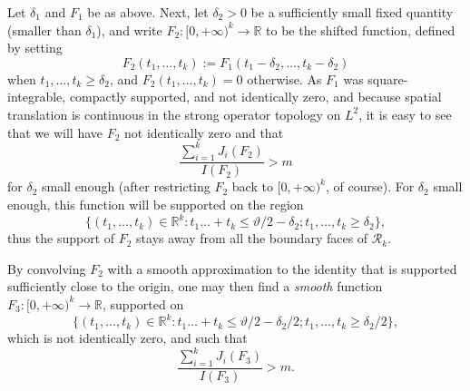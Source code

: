\documentclass{bmcart}
\theoremstyle{plain}
\theoremstyle{definition}
\newcommand\R{\mathbb{R}}
\begin{document}
Let $\delta_1$ and $F_1$ be as above. Next, let $\delta_2 > 0$ be a sufficiently small fixed quantity (smaller than $\delta_1$), and write $F_2: [0,+\infty)^k \to \R$ to be the shifted function, defined by setting
$$ F_2(t_1,\dots,t_k) := F_1( t_1-\delta_2, \dots, t_k-\delta_2 )$$
when $t_1,\dots,t_k \geq \delta_2$, and $F_2(t_1,\dots,t_k)=0$ otherwise.
As $F_1$ was square-integrable, compactly supported, and not identically zero, and because spatial translation is continuous in the strong operator topology on $L^2$, it is easy to see that we will have $F_2$ not identically zero and that
\begin{equation}\label{jbig-3}
 \frac{\sum_{i=1}^k J_i(F_2)}{I(F_2)} > m
\end{equation}
for $\delta_2$ small enough (after restricting $F_2$ back to $[0,+\infty)^k$, of course).  For $\delta_2$ small enough, this function will be supported on the region
$$
\{ (t_1,\dots,t_k) \in \R^k: t_1 \dots + t_k \leq \vartheta/2-\delta_2; t_1,\dots,t_k \geq \delta_2 \},$$
thus the support of $F_2$ stays away from all the boundary faces of ${\mathcal R}_k$.

By convolving $F_2$ with a smooth approximation to the identity that is supported sufficiently close to the origin, one may then find a \emph{smooth} function $F_3: [0,+\infty)^k \to \R$, supported on
$$
\{ (t_1,\dots,t_k) \in \R^k: t_1 \dots + t_k \leq \vartheta/2-\delta_2/2; t_1,\dots,t_k \geq \delta_2/2 \},$$
which is not identically zero, and such that
\begin{equation}\label{jbig-4}
 \frac{\sum_{i=1}^k J_i(F_3)}{I(F_3)} > m.
\end{equation}
\end{document}
